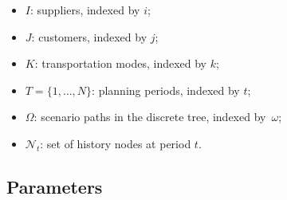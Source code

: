 \documentclass[11pt,a4paper]{article}
\begin{document}
\begin{itemize}
  \item \(I\): suppliers, indexed by \(i\);
  \item \(J\): customers, indexed by \(j\);
  \item \(K\): transportation modes, indexed by \(k\);
  \item \(T=\{1,\ldots,N\}\): planning periods, indexed by \(t\);
  \item \(\Omega\): scenario paths in the discrete tree,
  indexed by~\(\omega\);
  \item \(\mathcal{N}_t\): set of history nodes at period \(t\).
\end{itemize}

\subsection{Parameters}
\end{document}
